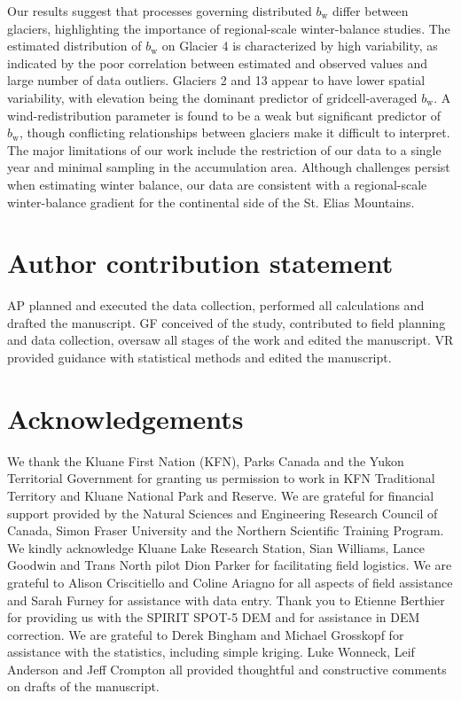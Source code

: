 \documentclass[twocolumn, letterpaper]{igs}
\begin{document}
Our results suggest that processes governing distributed $b_\mathrm{w}$ differ between glaciers, highlighting the importance of regional-scale winter-balance studies. The estimated distribution of $b_\mathrm{w}$ on Glacier 4 is characterized by high variability, as indicated by the poor correlation between estimated and observed values and large number of data outliers. Glaciers 2 and 13 appear to have lower spatial variability, with elevation being the dominant predictor of gridcell-averaged $b_\mathrm{w}$. A wind-redistribution parameter is found to be a weak but significant predictor of $b_\mathrm{w}$, though conflicting relationships between glaciers make it difficult to interpret. The major limitations of our work include the restriction of our data to a single year and minimal sampling in the accumulation area. Although challenges persist when estimating winter balance, our data are consistent with a regional-scale winter-balance gradient for the continental side of the St. Elias Mountains. 

\section{Author contribution statement}

AP planned and executed the data collection, performed all calculations and drafted the manuscript. GF conceived of the study, contributed to field planning and data collection, oversaw all stages of the work and edited the manuscript. VR provided guidance with statistical methods and edited the manuscript.

\section{Acknowledgements}

We thank the Kluane First Nation (KFN), Parks Canada and the Yukon Territorial Government for granting us permission to work in KFN Traditional Territory and Kluane National Park and Reserve. We are grateful for financial support provided by the Natural Sciences and Engineering Research Council of  Canada, Simon Fraser University and the Northern Scientific  Training  Program. We kindly acknowledge Kluane Lake Research Station, Sian Williams, Lance Goodwin and Trans North pilot Dion Parker for facilitating field logistics. We are grateful to Alison Criscitiello and Coline Ariagno for all aspects of field assistance and Sarah Furney for assistance with data entry. Thank you to Etienne Berthier for providing us with the SPIRIT SPOT-5 DEM and for assistance in DEM correction. We are grateful to Derek Bingham and Michael Grosskopf for assistance with the statistics, including simple kriging. Luke Wonneck, Leif Anderson and Jeff Crompton all provided thoughtful and constructive comments on drafts of the manuscript.
\end{document}
